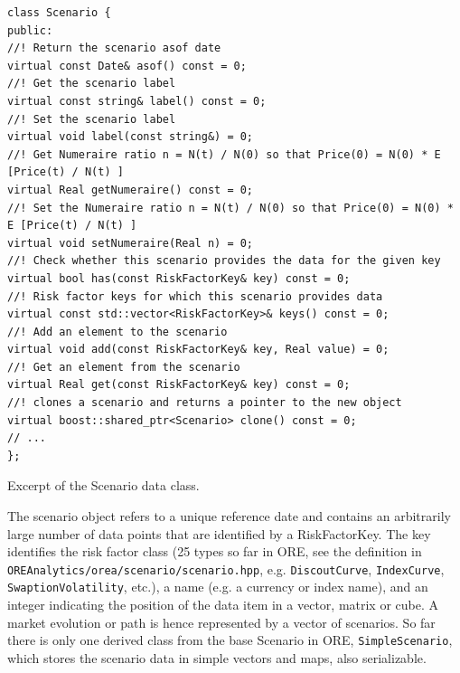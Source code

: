 \documentclass[12pt, a4paper]{article}
\begin{document}
\begin{listing}[H]
\begin{verbatim}
class Scenario {
public:
//! Return the scenario asof date
virtual const Date& asof() const = 0;
//! Get the scenario label
virtual const string& label() const = 0;
//! Set the scenario label
virtual void label(const string&) = 0;
//! Get Numeraire ratio n = N(t) / N(0) so that Price(0) = N(0) * E [Price(t) / N(t) ]
virtual Real getNumeraire() const = 0;
//! Set the Numeraire ratio n = N(t) / N(0) so that Price(0) = N(0) * E [Price(t) / N(t) ]
virtual void setNumeraire(Real n) = 0;
//! Check whether this scenario provides the data for the given key
virtual bool has(const RiskFactorKey& key) const = 0;
//! Risk factor keys for which this scenario provides data
virtual const std::vector<RiskFactorKey>& keys() const = 0;
//! Add an element to the scenario
virtual void add(const RiskFactorKey& key, Real value) = 0;
//! Get an element from the scenario
virtual Real get(const RiskFactorKey& key) const = 0;
//! clones a scenario and returns a pointer to the new object
virtual boost::shared_ptr<Scenario> clone() const = 0;
// ...
};
\end{verbatim}
\caption{Excerpt of the Scenario data class.}
\label{1st:scenario}
\end{listing}

The scenario object refers to a unique reference date and contains an arbitrarily large number of data points that are identified by a RiskFactorKey. The key identifies the risk factor class (25 types so far in ORE, see the definition in
{\tt OREAnalytics/orea/scenario/scenario.hpp}, e.g. {\tt DiscoutCurve}, {\tt IndexCurve}, {\tt SwaptionVolatility}, etc.), a name (e.g. a currency or index name), and an integer indicating the position of the data item in a vector, matrix or cube. A market
evolution or path is hence represented by a vector of scenarios. So far there is only one derived class from the base Scenario in ORE, {\tt SimpleScenario}, which stores the scenario data in simple vectors and maps, also serializable.
\end{document}

